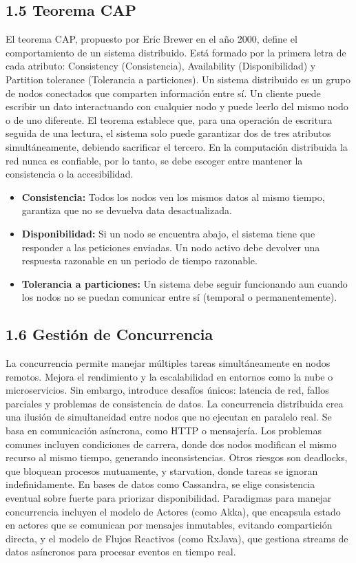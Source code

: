 \documentclass[a4paper,12pt]{article}
\begin{document}
\subsection*{1.5 Teorema CAP}
El teorema CAP, propuesto por Eric Brewer en el año 2000, define el comportamiento de un sistema distribuido. Está formado por la primera letra de cada atributo: Consistency (Consistencia), Availability (Disponibilidad) y Partition tolerance (Tolerancia a particiones). Un sistema distribuido es un grupo de nodos conectados que comparten información entre sí. Un cliente puede escribir un dato interactuando con cualquier nodo y puede leerlo del mismo nodo o de uno diferente. El teorema establece que, para una operación de escritura seguida de una lectura, el sistema solo puede garantizar dos de tres atributos simultáneamente, debiendo sacrificar el tercero. En la computación distribuida la red nunca es confiable, por lo tanto, se debe escoger entre mantener la consistencia o la accesibilidad.
\begin{itemize}
    \item \textbf{Consistencia:} Todos los nodos ven los mismos datos al mismo tiempo, garantiza que no se devuelva data desactualizada.
    \item \textbf{Disponibilidad:} Si un nodo se encuentra abajo, el sistema tiene que responder a las peticiones enviadas. Un nodo activo debe devolver una respuesta razonable en un periodo de tiempo razonable.
    \item \textbf{Tolerancia a particiones:} Un sistema debe seguir funcionando aun cuando los nodos no se puedan comunicar entre sí (temporal o permanentemente).
\end{itemize}

\subsection*{1.6 Gestión de Concurrencia}
La concurrencia permite manejar múltiples tareas simultáneamente en nodos remotos. Mejora el rendimiento y la escalabilidad en entornos como la nube o microservicios. Sin embargo, introduce desafíos únicos: latencia de red, fallos parciales y problemas de consistencia de datos. La concurrencia distribuida crea una ilusión de simultaneidad entre nodos que no ejecutan en paralelo real. Se basa en comunicación asíncrona, como HTTP o mensajería. Los problemas comunes incluyen condiciones de carrera, donde dos nodos modifican el mismo recurso al mismo tiempo, generando inconsistencias. Otros riesgos son deadlocks, que bloquean procesos mutuamente, y starvation, donde tareas se ignoran indefinidamente. En bases de datos como Cassandra, se elige consistencia eventual sobre fuerte para priorizar disponibilidad. Paradigmas para manejar concurrencia incluyen el modelo de Actores (como Akka), que encapsula estado en actores que se comunican por mensajes inmutables, evitando compartición directa, y el modelo de Flujos Reactivos (como RxJava), que gestiona streams de datos asíncronos para procesar eventos en tiempo real.
\end{document}
